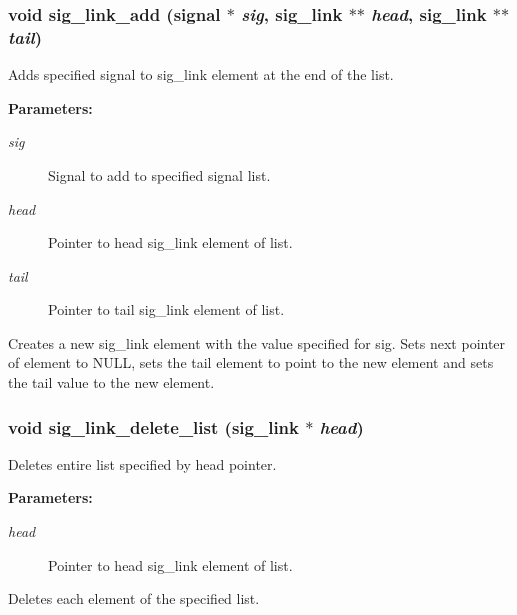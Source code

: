 \subsubsection{\setlength{\rightskip}{0pt plus 5cm}void sig\_\-link\_\-add ({\bf signal} $\ast$ {\em sig}, {\bf sig\_\-link} $\ast$$\ast$ {\em head}, {\bf sig\_\-link} $\ast$$\ast$ {\em tail})}\label{link_8h_a4}


Adds specified signal to sig\_\-link element at the end of the list.

\begin{Desc}
\item[{\bf Parameters: }]\par
\begin{description}
\item[
{\em sig}]Signal to add to specified signal list. \item[
{\em head}]Pointer to head sig\_\-link element of list. \item[
{\em tail}]Pointer to tail sig\_\-link element of list.

\end{description}
\end{Desc}
Creates a new sig\_\-link element with the value specified for sig. Sets next pointer of element to NULL, sets the tail element to point to the new element and sets the tail value to the new element. 
\subsubsection{\setlength{\rightskip}{0pt plus 5cm}void sig\_\-link\_\-delete\_\-list ({\bf sig\_\-link} $\ast$ {\em head})}\label{link_8h_a21}


Deletes entire list specified by head pointer.

\begin{Desc}
\item[{\bf Parameters: }]\par
\begin{description}
\item[
{\em head}]Pointer to head sig\_\-link element of list.

\end{description}
\end{Desc}
Deletes each element of the specified list. 
